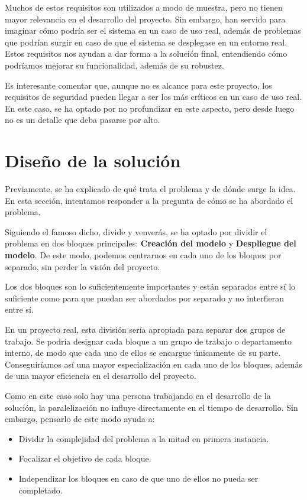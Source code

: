 Muchos de estos requisitos son utilizados a modo de muestra, pero no tienen mayor relevancia en el desarrollo del proyecto.
Sin embargo, han servido para imaginar cómo podría ser el sistema en un caso de uso real, además de problemas que podrían surgir en caso de que el sistema se desplegase en un entorno real.
Estos requisitos nos ayudan a dar forma a la solución final, entendiendo cómo podríamos mejorar su funcionalidad, además de su robustez.

Es interesante comentar que, aunque no es alcance para este proyecto, los requisitos de seguridad pueden llegar a ser los más críticos en un caso de uso real.
En este caso, se ha optado por no profundizar en este aspecto, pero desde luego no es un detalle que deba pasarse por alto.



\section{Diseño de la solución}\label{sec:diseno}

Previamente, se ha explicado de qué trata el problema y de dónde surge la idea.
En esta sección, intentamos responder a la pregunta de cómo se ha abordado el problema.

Siguiendo el famoso dicho, divide y venverás, se ha optado por dividir el problema en dos bloques principales: \textbf{Creación del modelo} y \textbf{Despliegue del modelo}.
De este modo, podemos centrarnos en cada uno de los bloques por separado, sin perder la visión del proyecto.

Los dos bloques son lo suficientemente importantes y están separados entre sí lo suficiente como para que puedan ser abordados por separado y no interfieran entre sí.

En un proyecto real, esta división sería apropiada para separar dos grupos de trabajo.
Se podría designar cada bloque a un grupo de trabajo o departamento interno, de modo que cada uno de ellos se encargue únicamente de su parte.
Conseguiríamos así una mayor especialización en cada uno de los bloques, además de una mayor eficiencia en el desarrollo del proyecto.

Como en este caso solo hay una persona trabajando en el desarrollo de la solución, la paralelización no influye directamente en el tiempo de desarrollo.
Sin embargo, pensarlo de este modo ayuda a:

\begin{itemize}\itemsep1pt \parskip0pt 
    \item Dividir la complejidad del problema a la mitad en primera instancia.
    \item Focalizar el objetivo de cada bloque.
    \item Independizar los bloques en caso de que uno de ellos no pueda ser completado.
\end{itemize}

